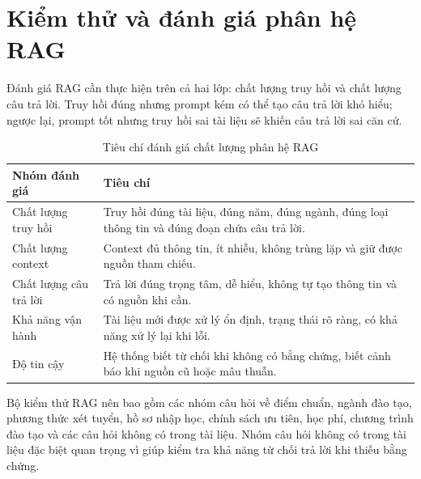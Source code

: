 \section{Kiểm thử và đánh giá phân hệ RAG}

Đánh giá RAG cần thực hiện trên cả hai lớp: chất lượng truy hồi và chất lượng câu trả lời. Truy hồi đúng nhưng prompt kém có thể tạo câu trả lời khó hiểu; ngược lại, prompt tốt nhưng truy hồi sai tài liệu sẽ khiến câu trả lời sai căn cứ.

\begin{table}[H]
\centering
\begin{tabular}{|p{4cm}|p{8.8cm}|}
\hline
\textbf{Nhóm đánh giá} & \textbf{Tiêu chí} \\
\hline
Chất lượng truy hồi & Truy hồi đúng tài liệu, đúng năm, đúng ngành, đúng loại thông tin và đúng đoạn chứa câu trả lời. \\
\hline
Chất lượng context & Context đủ thông tin, ít nhiễu, không trùng lặp và giữ được nguồn tham chiếu. \\
\hline
Chất lượng câu trả lời & Trả lời đúng trọng tâm, dễ hiểu, không tự tạo thông tin và có nguồn khi cần. \\
\hline
Khả năng vận hành & Tài liệu mới được xử lý ổn định, trạng thái rõ ràng, có khả năng xử lý lại khi lỗi. \\
\hline
Độ tin cậy & Hệ thống biết từ chối khi không có bằng chứng, biết cảnh báo khi nguồn cũ hoặc mâu thuẫn. \\
\hline
\end{tabular}
\caption{Tiêu chí đánh giá chất lượng phân hệ RAG}
\label{tab:rag-evaluation-criteria}
\end{table}

Bộ kiểm thử RAG nên bao gồm các nhóm câu hỏi về điểm chuẩn, ngành đào tạo, phương thức xét tuyển, hồ sơ nhập học, chính sách ưu tiên, học phí, chương trình đào tạo và các câu hỏi không có trong tài liệu. Nhóm câu hỏi không có trong tài liệu đặc biệt quan trọng vì giúp kiểm tra khả năng từ chối trả lời khi thiếu bằng chứng.
